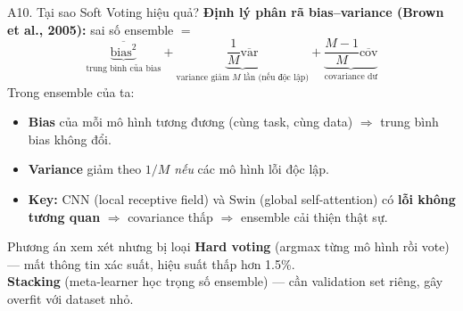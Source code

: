 \documentclass[10pt, aspectratio=169]{beamer}
\begin{document}
\begin{frame}{A10. Tại sao Soft Voting hiệu quả?}
    \footnotesize
    \textbf{Định lý phân rã bias--variance (Brown et al., 2005):} sai số ensemble $=$
    \[
        \underbrace{\overline{\mathrm{bias}^2}}_{\text{trung bình của bias}} + \underbrace{\frac{1}{M}\overline{\mathrm{var}}}_{\text{variance giảm } M\text{ lần (nếu độc lập)}} + \underbrace{\frac{M-1}{M}\overline{\mathrm{cov}}}_{\text{covariance dư}}
    \]
    Trong ensemble của ta:
    \begin{itemize}
        \item \textbf{Bias} của mỗi mô hình tương đương (cùng task, cùng data) $\Rightarrow$ trung bình bias không đổi.
        \item \textbf{Variance} giảm theo $1/M$ \textit{nếu} các mô hình lỗi độc lập.
        \item \textbf{Key:} CNN (local receptive field) và Swin (global self-attention) có \textbf{lỗi không tương quan} $\Rightarrow$ covariance thấp $\Rightarrow$ ensemble cải thiện thật sự.
    \end{itemize}

    \vspace{0.15cm}
    \begin{block}{Phương án xem xét nhưng bị loại}
        \footnotesize
        \textbf{Hard voting} (argmax từng mô hình rồi vote) --- mất thông tin xác suất, hiệu suất thấp hơn 1.5\%.\\
        \textbf{Stacking} (meta-learner học trọng số ensemble) --- cần validation set riêng, gây overfit với dataset nhỏ.
    \end{block}
\end{frame}
\end{document}
